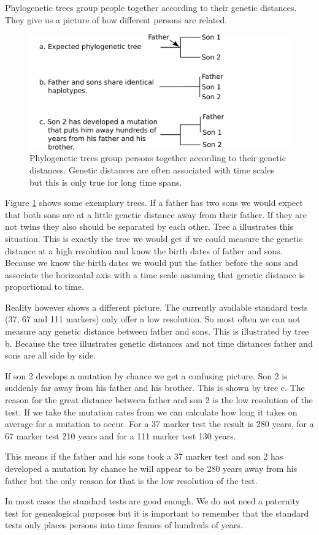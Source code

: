 Phylogenetic trees group people together according to their
genetic distances. They give us a picture of how different
persons are related.

\begin{figure}[ht]
\centering
\includegraphics[width=13cm]{img/phylotrees.png}
\caption{\label{phylotrees} Phylogenetic trees group persons
together according to their genetic distances. Genetic
distances are often associated with time scales but this
is only true for long time spans.}
\end{figure}

Figure \ref{phylotrees} shows some exemplary trees. If a
father has two sons we would expect that both sons are at
a little genetic distance away from their father. If they
are not twins they also should be separated by each other.
Tree a illustrates this situation. This is exactly the
tree we would get if we could measure the genetic distance
at a high resolution and know the birth dates of father and
sons. Because we know the birth dates we would put the father
before the sons and associate the horizontal axis with a
time scale assuming that genetic distance is proportional
to time.

Reality however shows a different picture. The currently
available standard tests (37, 67 and 111 markers) only offer
a low resolution. So most often we can not measure any genetic
distance between father and sons. This is illustrated by
tree b. Because the tree illustrates genetic distances and
not time distances father and sons are all side by side.

If son 2 develops a mutation by chance we get a confusing picture.
Son 2 is suddenly far away from his father and his brother.
This is shown by tree c. The reason for the great distance
between father and son 2 is the low resolution of the test.
If we take the mutation rates from \cite{Kly12} we can
calculate how long it takes on average for a mutation to
occur. For a 37 marker test the result is 280 years, for
a 67 marker test 210 years and for a 111 marker test 130
years. 

This means if the father and his sons took a 37 marker test
and son 2 has developed a mutation by chance he will appear
to be 280 years away from his father but the only reason for
that is the low resolution of the test.

In most cases the standard tests are good enough. We do not
need a paternity test for genealogical purposes but it is
important to remember that the standard tests only places
persons into time frames of hundreds of years.




